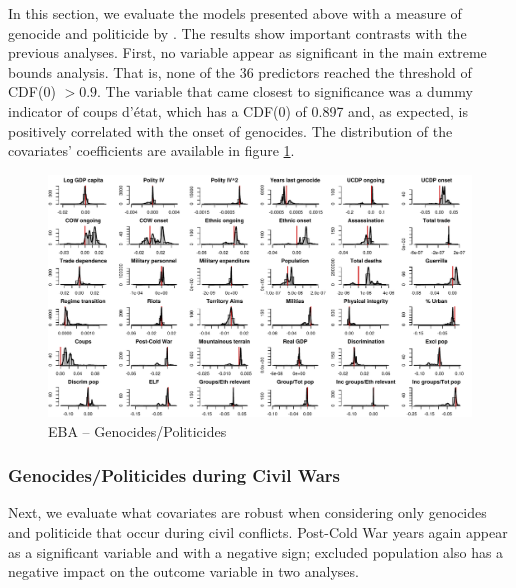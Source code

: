 \documentclass[a4paper,12pt]{article}
\begin{document}
In this section, we evaluate the models presented above with a measure of genocide and politicide by \citet{harff2003no}. The results show important contrasts with the previous analyses. First, no variable appear as significant in the main extreme bounds analysis. That is, none of the 36 predictors reached the threshold of CDF(0) $> 0.9$. The variable that came closest to significance was a dummy indicator of coups d'état, which has a CDF(0) of 0.897 and, as expected, is positively correlated with the onset of genocides. The distribution of the covariates' coefficients are available in figure \ref{fig:uamk}.

\clearpage
\begin{figure}
    \centering
    \includegraphics[width=\textwidth]{images/uamk.pdf}
    \caption{EBA -- Genocides/Politicides}
    \label{fig:uamk}
\end{figure}
\clearpage

\subsubsection{Genocides/Politicides during Civil Wars}

Next, we evaluate what covariates are robust when considering only genocides and politicide that occur during civil conflicts. Post-Cold War years again appear as a significant variable and with a negative sign; excluded population also has a negative impact on the outcome variable in two analyses.

\vspace{1cm}
\end{document}
